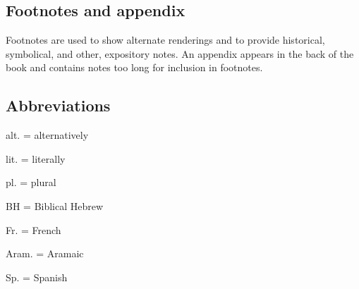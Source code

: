 \subsection*{Footnotes and appendix}
Footnotes are used to show alternate renderings and to provide historical, symbolical, and other, expository notes. An appendix appears in the back of the book and contains notes too long for inclusion in footnotes.

\subsection*{Abbreviations}
alt. = alternatively

lit. = literally %

pl. = plural

BH = Biblical Hebrew

Fr. = French

Aram. = Aramaic

Sp. = Spanish
\twocolumn
